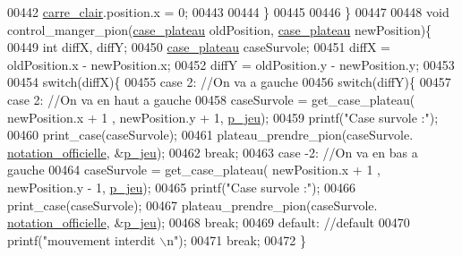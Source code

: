 \begin{DoxyCode}
00442                 \hyperlink{fonction_interface_8h_aa6a56f4dc2396c5f9de42147f569c367}{carre_clair}.position.x = 0;
00443 
00444         \}
00445 
00446 \}
00447 
00448 \textcolor{keywordtype}{void} control\_manger\_pion(\hyperlink{structcase__plateau}{case_plateau} oldPosition, \hyperlink{structcase__plateau}{case_plateau} newPosition)\{
00449         \textcolor{keywordtype}{int} diffX, diffY;
00450         \hyperlink{structcase__plateau}{case_plateau} caseSurvole;
00451         diffX = oldPosition.x - newPosition.x;
00452         diffY = oldPosition.y - newPosition.y;
00453 
00454         \textcolor{keywordflow}{switch}(diffX)\{
00455                 \textcolor{keywordflow}{case} 2: \textcolor{comment}{//On va a gauche}
00456                         \textcolor{keywordflow}{switch}(diffY)\{
00457                         \textcolor{keywordflow}{case} 2: \textcolor{comment}{//On va en haut a gauche}
00458                                 caseSurvole = get\_case\_plateau( newPosition.x + 1
      , newPosition.y + 1, \hyperlink{moteur_8h_a3efa8d0f7c65daedc584dc8db048e62c}{p_jeu});
00459                                 printf(\textcolor{stringliteral}{"Case survole :"});
00460                                 print\_case(caseSurvole);
00461                                 plateau\_prendre\_pion(caseSurvole.
      \hyperlink{structcase__plateau_ad510581b324604a9cf685cbb769a421a}{notation_officielle}, &\hyperlink{moteur_8h_a3efa8d0f7c65daedc584dc8db048e62c}{p_jeu});
00462                                 \textcolor{keywordflow}{break};
00463                         \textcolor{keywordflow}{case} -2: \textcolor{comment}{//On va en bas a gauche}
00464                                 caseSurvole = get\_case\_plateau( newPosition.x + 1
      , newPosition.y - 1, \hyperlink{moteur_8h_a3efa8d0f7c65daedc584dc8db048e62c}{p_jeu});
00465                                 printf(\textcolor{stringliteral}{"Case survole :"});
00466                                 print\_case(caseSurvole);
00467                                 plateau\_prendre\_pion(caseSurvole.
      \hyperlink{structcase__plateau_ad510581b324604a9cf685cbb769a421a}{notation_officielle}, &\hyperlink{moteur_8h_a3efa8d0f7c65daedc584dc8db048e62c}{p_jeu});
00468                                 \textcolor{keywordflow}{break};
00469                         \textcolor{keywordflow}{default}: \textcolor{comment}{//default}
00470                                 printf(\textcolor{stringliteral}{"mouvement interdit \(\backslash\)n"});
00471                                 \textcolor{keywordflow}{break};
00472                         \}

\end{DoxyCode}
